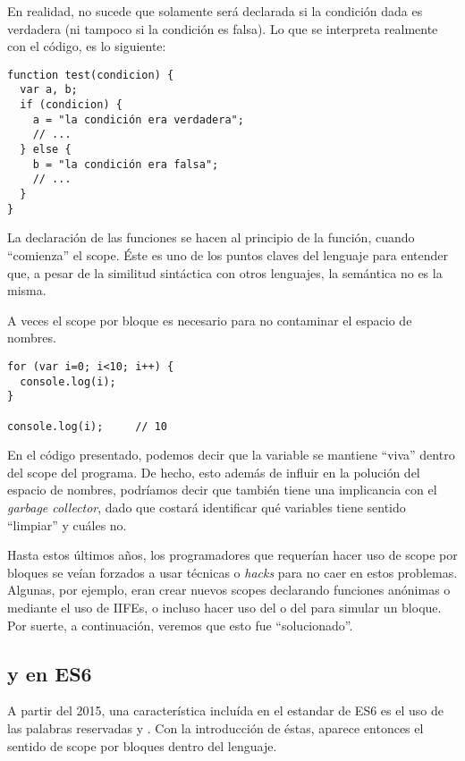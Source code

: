 En realidad, no sucede que  solamente será declarada si la condición dada es verdadera (ni tampoco  si la condición es falsa). Lo que se interpreta realmente con el código, es lo siguiente:

\begin{lstlisting}
function test(condicion) {
  var a, b;
  if (condicion) {
    a = "la condición era verdadera";
    // ...
  } else {
    b = "la condición era falsa";
    // ...
  }
}
\end{lstlisting}

La declaración de las funciones se hacen al principio de la función, cuando "`comienza"' el scope. Éste es uno de los puntos claves del lenguaje para entender que, a pesar de la similitud sintáctica con otros lenguajes, la semántica no es la misma. 

A veces el scope por bloque es necesario para no contaminar el espacio de nombres. 

\begin{lstlisting}[title={Contaminando el espacio de nombres}]
for (var i=0; i<10; i++) {
  console.log(i);
}

console.log(i);		// 10
\end{lstlisting}

En el código presentado, podemos decir que la variable  se mantiene "`viva"' dentro del scope del programa. De hecho, esto además de influir en la polución del espacio de nombres, podríamos decir que también tiene una implicancia con el \textit{garbage collector}, dado que costará identificar qué variables tiene sentido "`limpiar"' y cuáles no.

Hasta estos últimos años, los programadores que requerían hacer uso de scope por bloques se veían forzados a usar técnicas o \textit{hacks} para no caer en estos problemas. Algunas, por ejemplo, eran crear nuevos scopes declarando funciones anónimas o mediante el uso de IIFEs, o incluso hacer uso del  o del  para simular un bloque. Por suerte, a continuación, veremos que esto fue "`solucionado"'.

\subsection{ y  en ES6}
\label{subsec:letyconst}

A partir del 2015, una característica incluída en el estandar de ES6 es el uso de las palabras reservadas  y . Con la introducción de éstas, aparece entonces el sentido de scope por bloques dentro del lenguaje.

